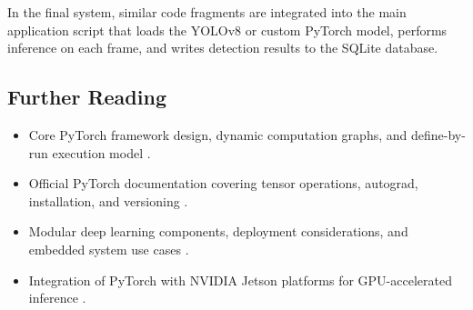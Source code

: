 In the final system, similar code fragments are integrated into the main application script that loads the YOLOv8 or custom PyTorch model, performs inference on each frame, and writes detection results to the SQLite database.



\subsection{Further Reading}

\begin{itemize}
	\item Core PyTorch framework design, dynamic computation graphs, and define-by-run execution model \cite{paszke2019pytorch, goodfellow2016deep}.
	\item Official PyTorch documentation covering tensor operations, autograd, installation, and versioning \cite{pytorchdocs}.
	\item Modular deep learning components, deployment considerations, and embedded system use cases \cite{pinto2022springer}.
	\item Integration of PyTorch with NVIDIA Jetson platforms for GPU-accelerated inference \cite{jetsonpytorch, nvidia_jetson}.
\end{itemize}

